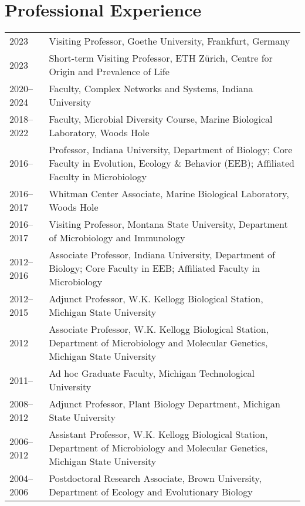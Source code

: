 \documentclass[11pt]{article}
\begin{document}
\section*{Professional Experience}
\vspace{-1.25em} %
\noindent
\begin{tabularx}{\textwidth}{@{}l@{\hspace{2em}}X@{}}
2023         & Visiting Professor, Goethe University, Frankfurt, Germany \\
2023         & Short-term Visiting Professor, ETH Zürich, Centre for Origin and Prevalence of Life \\
2020--2024   & Faculty, Complex Networks and Systems, Indiana University \\
2018--2022   & Faculty, Microbial Diversity Course, Marine Biological Laboratory, Woods Hole \\
2016--       & Professor, Indiana University, Department of Biology; Core Faculty in Evolution, Ecology \& Behavior (EEB); Affiliated Faculty in Microbiology \\
2016--2017   & Whitman Center Associate, Marine Biological Laboratory, Woods Hole \\
2016--2017   & Visiting Professor, Montana State University, Department of Microbiology and Immunology \\
2012--2016   & Associate Professor, Indiana University, Department of Biology; Core Faculty in EEB; Affiliated Faculty in Microbiology \\
2012--2015   & Adjunct Professor, W.K. Kellogg Biological Station, Michigan State University \\
2012         & Associate Professor, W.K. Kellogg Biological Station, Department of Microbiology and Molecular Genetics, Michigan State University \\
2011--       & Ad hoc Graduate Faculty, Michigan Technological University \\
2008--2012   & Adjunct Professor, Plant Biology Department, Michigan State University \\
2006--2012   & Assistant Professor, W.K. Kellogg Biological Station, Department of Microbiology and Molecular Genetics, Michigan State University \\
2004--2006   & Postdoctoral Research Associate, Brown University, Department of Ecology and Evolutionary Biology \\
\end{tabularx}
\end{document}
